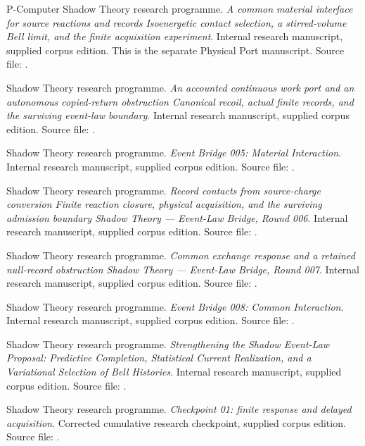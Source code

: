 \documentclass[11pt,oneside,openany]{book}
\theoremstyle{definition}
\theoremstyle{remark}\newtheorem{remark}[theorem]{Remark}
\begin{document}
\begin{thebibliography}{P-Computer}
Shadow Theory research programme.
\emph{A common material interface for source reactions and records Isoenergetic contact selection, a stirred-volume Bell limit, and the finite acquisition experiment}.
Internal research manuscript, supplied corpus edition.
This is the separate Physical Port manuscript.
Source file: .

Shadow Theory research programme.
\emph{An accounted continuous work port and an autonomous copied-return obstruction Canonical recoil, actual finite records, and the surviving event-law boundary}.
Internal research manuscript, supplied corpus edition.
Source file: .

Shadow Theory research programme.
\emph{Event Bridge 005: Material Interaction}.
Internal research manuscript, supplied corpus edition.
Source file: .

Shadow Theory research programme.
\emph{Record contacts from source-charge conversion Finite reaction closure, physical acquisition, and the surviving admission boundary Shadow Theory --- Event-Law Bridge, Round 006}.
Internal research manuscript, supplied corpus edition.
Source file: .

Shadow Theory research programme.
\emph{Common exchange response and a retained null-record obstruction Shadow Theory --- Event-Law Bridge, Round 007}.
Internal research manuscript, supplied corpus edition.
Source file: .

Shadow Theory research programme.
\emph{Event Bridge 008: Common Interaction}.
Internal research manuscript, supplied corpus edition.
Source file: .

Shadow Theory research programme.
\emph{Strengthening the Shadow Event-Law Proposal: Predictive Completion, Statistical Current Realization, and a Variational Selection of Bell Histories}.
Internal research manuscript, supplied corpus edition.
Source file: .

Shadow Theory research programme.
\emph{Checkpoint 01: finite response and delayed acquisition}.
Corrected cumulative research checkpoint, supplied corpus edition.
Source file: .


\end{thebibliography}
\end{document}
